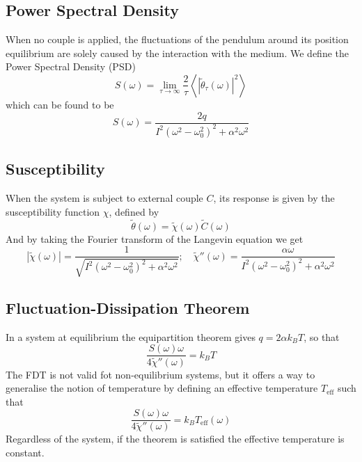 \subsection{Power Spectral Density}
When no couple is applied, the fluctuations of the pendulum around its position equilibrium are solely caused by the interaction with the medium. We define the Power Spectral Density (PSD)
\begin{equation}
    S(\omega) = \lim_{\tau \rightarrow \infty} \frac{2}{\tau} \left\langle \left| \tilde{\theta}_\tau (\omega) \right|^2 \right\rangle
\end{equation}
which can be found to be
\begin{equation}
    S(\omega) = \frac{2q}{I^2(\omega^2 - \omega_0^2)^2 + \alpha^2 \omega^2}
\end{equation}

\subsection{Susceptibility}
When the system is subject to external couple $C$, its response is given by the susceptibility function $\chi$, defined by
\begin{equation}
    \tilde{\theta} (\omega) = \tilde{\chi}(\omega) \tilde{C}(\omega)
\end{equation}
And by taking the Fourier transform of the Langevin equation we get
\begin{equation}
    \left|\tilde{\chi} (\omega)\right| = \frac{1}{\sqrt{I^2 ( \omega^2 - \omega^2_0)^2 + \alpha^2 \omega^2}};\quad \tilde{\chi}'' (\omega) = \frac{\alpha \omega}{I^2 (\omega^2 - \omega_0^2)^2 + \alpha^2 \omega^2}
\end{equation}

\subsection{Fluctuation-Dissipation Theorem}
In a system at equilibrium the equipartition theorem gives $q = 2 \alpha k_B T$, so that
\begin{equation}
    \frac{S(\omega) \omega}{4 \tilde{\chi}'' (\omega)} = k_B T
\end{equation}
The FDT is not valid fot non-equilibrium systems, but it offers a way to generalise the notion of temperature by defining an effective temperature $T_{\text{eff}}$ such that
\begin{equation}
    \frac{S(\omega) \omega}{4 \tilde{\chi}'' (\omega)} = k_B T_{\text{eff}}(\omega)
\end{equation}
Regardless of the system, if the theorem is satisfied the effective temperature is constant.
\cite{mayor_fluid_2005}